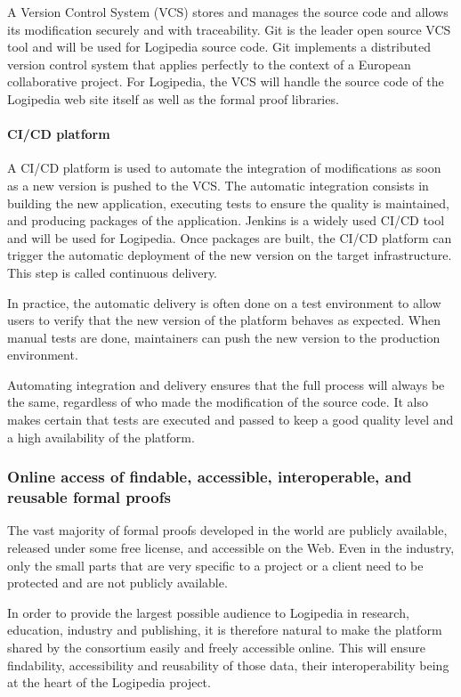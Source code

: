 A Version Control System (VCS) stores and manages the source code and
allows its modification securely and with traceability. Git is the leader
open source VCS tool and will be used for Logipedia source code. Git implements
a distributed version control system that applies perfectly to the context of
a European collaborative project. For Logipedia, the VCS will handle the
source code of the Logipedia web site itself as well as the formal proof libraries.

\paragraph*{CI/CD platform}

A CI/CD platform is used to automate the integration of modifications
as soon as a new version is pushed to the VCS. The automatic integration
consists in building the new application, executing tests to ensure
the quality is maintained, and producing packages of the application.
Jenkins is a widely used CI/CD tool and will be used for Logipedia.
Once packages are built, the CI/CD platform can trigger the automatic
deployment of the new version on the target infrastructure.
This step is called continuous delivery.

In practice, the automatic delivery is often done on a test environment
to allow users to verify that the new version of the platform
behaves as expected. When manual tests are done, maintainers can push
the new version to the production environment.

Automating integration and delivery ensures that the full process
will always be the same, regardless of who made the modification
of the source code. It also makes certain that tests are executed and passed
to keep a good quality level and a high availability of the platform.

\subsubsection*{Online access of findable, accessible, interoperable, and
reusable formal proofs}

The vast majority of formal proofs developed in the world are publicly
available, released under some free license, and accessible on the
Web. Even in the industry, only the small parts that are very specific
to a project or a client need to be protected and are not publicly
available.

In order to provide the largest possible audience to Logipedia in
research, education, industry and publishing, it is therefore natural
to make the platform shared by the consortium easily and freely
accessible online. This will ensure findability,
accessibility and reusability of those data, their interoperability
being at the heart of the Logipedia project.

